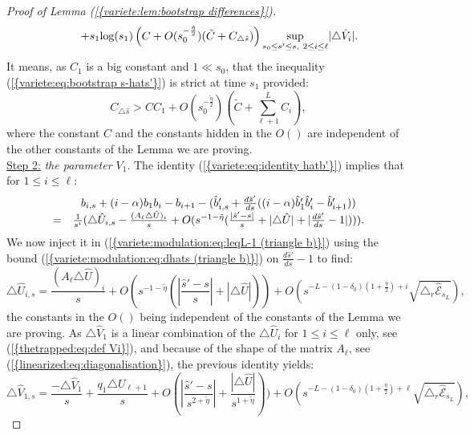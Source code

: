 \documentclass[11pt,a4paper,reqno]{amsart}
\theoremstyle{remark}
\numberwithin{equation}{section}
\begin{document}
\begin{proof}[Proof of Lemma {{\rm (\ref{{variete:lem:bootstrap differences}})}}]
$$\begin{array}{r c l}
&&+s_1\text{log}(s_1)\left( C+O(s_0^{-\frac{\tilde{\eta}}{2}})(\tilde{C}+ C_{\triangle \hat{s}}) \right)  \underset{s_0\leq s' \leq s, \ 2\leq i \leq \ell}{\text{sup}}|\triangle \hat{V}_i|.
\end{array}
$$
It means, as $C_1$ is a big constant and $1\ll s_0$, that the inequality {{\rm (\ref{{variete:eq:bootstrap s-hats'}})}} is strict at time $s_1$  provided:
\begin{equation} \label{variete:bootstrap:condition hats'}
C_{\triangle \hat{s}}> CC_1+O(s_0^{-\frac{\tilde{\eta}}{2}})(\tilde{C}+\sum_{\ell+1}^L C_i),
\end{equation}
where the constant $C$ and the constants hidden in the $O()$ are independent of the other constants of the Lemma we are proving.\\

\underline{Step 2:} \emph{the parameter $V_1$}. The identity {{\rm (\ref{{variete:eq:identity hatb'}})}} implies that for $1\leq i \leq \ell$:
\begin{equation}
\begin{array}{r c l}
&b_{i,s}+(i-\alpha)b_1b_i-b_{i+1}-(\hat{b}'_{i,s}+\frac{d\hat{s}'}{ds}((i-\alpha)\hat{b}'_1\hat{b}'_i-\hat{b}'_{i+1}))\\
=& \frac{1}{s^i}(\triangle \hat{U}_{i,s}-\frac{(A_{\ell}\triangle \hat{U})_i}{s}+O(s^{-1-\tilde{\eta}}(\frac{|\hat{s}'-s|}{s}+|\triangle \hat{U}|+|\frac{d\hat{s}'}{ds}-1|))).
\end{array}
\end{equation}
We now inject it in {{\rm (\ref{{variete:modulation:eq:leqL-1 (triangle b)}})}} using the bound {{\rm (\ref{{variete:modulation:eq:dhats (triangle b)}})}} on $\frac{d\hat{s}'}{ds}-1$ to find:
\begin{equation} \label{variete:eq:expression dttriangleUi}
\triangle \hat{U}_{i,s}=\frac{(A_{\ell}\triangle \hat{U})_i}{s}+O(s^{-1-\tilde{\eta}}(|\frac{\hat{s}'-s}{s}|+|\triangle \hat{U}|))+O(s^{-L-(1-\delta_0)(1+\frac{\eta}{2})+i}\sqrt{\triangle_r \hat{\mathcal{E}}_{s_L}}),
\end{equation}
the constants in the $O()$ being independent of the constants of the Lemma we are proving. As $\triangle \hat{V}_1$ is a linear combination of the $\triangle \hat{U}_i$ for $1\leq i \leq \ell$ only, see {{\rm (\ref{{thetrapped:eq:def Vi}})}}, and because of the shape of the matrix $A_{\ell}$, see {{\rm (\ref{{linearized:eq:diagonalisation}})}}, the previous identity yields:
$$
\triangle \hat{V}_{1,s}=\frac{-\triangle \hat{V}_1}{s}+\frac{q_1\triangle U_{\ell+1}}{s}+O(|\frac{\hat{s}'-s}{s^{2+\tilde{\eta}}}|+\frac{|\triangle \hat{U}|}{s^{1+\tilde{\eta}}}))+O(s^{-L-(1-\delta_0)(1+\frac{\eta}{2})+\ell}\sqrt{\triangle_r \hat{\mathcal{E}}_{s_L}}),
$$
\end{proof}
\end{document}
